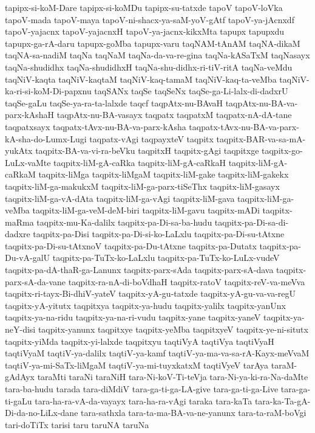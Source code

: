 {tapipx-si-koM-Dare
tapipx-si-koMDu
tapipx-su-tatxde
tapoV
tapoV-loVka
tapoV-mada
tapoV-maya
tapoV-ni-shacx-ya-saM-yoV-gAtf
tapoV-ya-jAcnxdf
tapoV-yajacnx
tapoV-yajacnxH
tapoV-ya-jacnx-kikxMta
tapupx
tapupxdu
tapupx-ga-rA-daru
tapupx-goMba
tapupx-varu
taqNAM-tAnAM
taqNA-dikaM
taqNA-sa-nadiM
taqNa
taqNaM
taqNa-da-va-re-gina
taqNa-kASaTxM
taqNasayx
taqNa-shudidhx
taqNa-shudidhxH
taqNa-shu-didhx-ri-tiV-ritA
taqNa-veMdu
taqNiV-kaqta
taqNiV-kaqtaM
taqNiV-kaq-tamaM
taqNiV-kaq-ta-veMba
taqNiV-ka-ri-si-koM-Di-papxnu
taqSANx
taqSe
taqSeNx
taqSe-ga-Li-lalx-di-dadxrU
taqSe-gaLu
taqSe-ya-ra-ta-lalxde
taqcf
taqpAtx-nu-BAvaH
taqpAtx-nu-BA-va-parx-kAshaH
taqpAtx-nu-BA-vasayx
taqpatx
taqpatxM
taqpatx-nA-dA-tane
taqpatxsayx
taqpatx-tAvx-nu-BA-va-parx-kAsha
taqpatx-tAvx-nu-BA-va-parx-kA-sha-do-Lumx-Lugi
taqpatx-vAgi
taqpayxteV
taqpitx
taqpitx-BAR-va-sa-mA-yukAtx
taqpitx-BA-va-vi-ra-beVku
taqpitxH
taqpitx-gAgi
taqpitxge
taqpitx-go-LuLx-vaMte
taqpitx-liM-gA-caRka
taqpitx-liM-gA-caRkaH
taqpitx-liM-gA-caRkaM
taqpitx-liMga
taqpitx-liMgaM
taqpitx-liM-gake
taqpitx-liM-gakekx
taqpitx-liM-ga-makukxM
taqpitx-liM-ga-parx-tiSeThx
taqpitx-liM-gasayx
taqpitx-liM-ga-vA-dAta
taqpitx-liM-ga-vAgi
taqpitx-liM-gava
taqpitx-liM-ga-veMba
taqpitx-liM-ga-veM-deM-biri
taqpitx-liM-gavu
taqpitx-mADi
taqpitx-maRma
taqpitx-mu-Ka-dalilx
taqpitx-pa-Di-sa-ba-hudu
taqpitx-pa-Di-sa-di-dadxre
taqpitx-pa-Disi
taqpitx-pa-Di-si-ko-LaLxlu
taqpitx-pa-Di-su-tAtxne
taqpitx-pa-Di-su-tAtxnoV
taqpitx-pa-Du-tAtxne
taqpitx-pa-Dutatx
taqpitx-pa-Du-vA-galU
taqpitx-pa-TuTx-ko-LaLxlu
taqpitx-pa-TuTx-ko-LuLx-vudeV
taqpitx-pa-dA-thaR-ga-Lanunx
taqpitx-parx-sAda
taqpitx-parx-sA-dava
taqpitx-parx-sA-da-vane
taqpitx-ra-nA-di-boVdhaH
taqpitx-ratoV
taqpitx-reV-va-meVva
taqpitx-ri-tayx-Bi-dhiV-yateV
taqpitx-yA-gu-tatxde
taqpitx-yA-gu-va-va-regU
taqpitx-yA-yitutx
taqpitxya
taqpitx-ya-hudu
taqpitx-yalilx
taqpitx-yanUnx
taqpitx-ya-na-ridu
taqpitx-ya-na-ri-vudu
taqpitx-yane
taqpitx-yaneV
taqpitx-ya-neY-disi
taqpitx-yanunx
taqpitxye
taqpitx-yeMba
taqpitxyeV
taqpitx-ye-ni-situtx
taqpitx-yiMda
taqpitx-yi-lalxde
taqpitxyu
taqtiVyA
taqtiVya
taqtiVyaH
taqtiVyaM
taqtiV-ya-dalilx
taqtiV-ya-kamf
taqtiV-ya-ma-va-sa-rA-Kayx-meVvaM
taqtiV-ya-mi-SaTx-liMgaM
taqtiV-ya-mi-tuyxkatxM
taqtiVyeV
tarAya
taraM-gAdAyx
taraMti
taraNi
taraNiH
tara-Ni-koV-Ti-teVja
tara-Ni-ya-ki-ra-Na-daMte
tara-ba-hudu
tarada
tara-diMdiV
tara-ga-ti-ga-LA-give
tara-ga-ti-ga-Live
tara-ga-ti-gaLu
tara-ha-ra-vA-da-vayayx
tara-ha-ra-vAgi
taraka
tara-kaTa
tara-ka-Ta-gA-Di-da-no-LiLx-dane
tara-sathxla
tara-ta-ma-BA-va-ne-yanunx
tara-ta-raM-boVgi
tari-doTiTx
tarisi
taru
taruNA
taruNa
}
